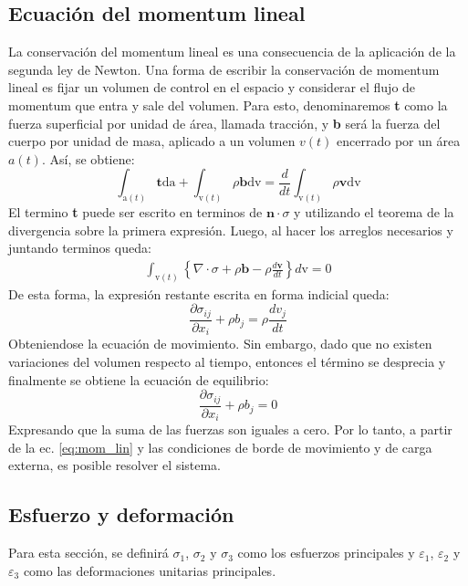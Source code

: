 \newpage

\subsection{Ecuación del momentum lineal}

La conservación del momentum lineal es una consecuencia de la aplicación de la segunda ley de Newton. Una forma de escribir la conservación de momentum lineal es fijar un volumen de control en el espacio y considerar el flujo de momentum que entra y sale del volumen. Para esto, denominaremos \textbf{t} como la fuerza superficial por unidad de área, llamada tracción, y \textbf{b} será la fuerza del cuerpo por unidad de masa, aplicado a un volumen $v(t)$ encerrado por un área $a(t)$. Así, se obtiene:
\begin{equation}
	\int_{\text{a}(t)} \mathbf{t} \text{da} + \int_{\text{v}(t)} \rho \mathbf{b} \text{dv} = \frac{d}{dt} \int_{\text{v}(t)} \rho \mathbf{v} \text{dv}
\end{equation}
El termino \textbf{t} puede ser escrito en terminos de $\mathbf{n}\cdot \sigma$ y utilizando el teorema de la divergencia sobre la primera expresión. Luego, al hacer los arreglos necesarios y juntando terminos queda:
\begin{gather*}
	\int_{\text{v}(t)} \left\lbrace \nabla \cdot \sigma + \rho\mathbf{b} - \rho \frac{d\mathbf{v}}{dt}\right\rbrace d\text{v} = 0
\end{gather*}
De esta forma, la expresión restante escrita en forma indicial queda:
\begin{equation}
	\frac{\partial \sigma_{ij}}{\partial x_i} + \rho b_j = \rho \frac{dv_j}{dt}
\end{equation}
Obteniendose la ecuación de movimiento. Sin embargo, dado que no existen variaciones del volumen respecto al tiempo, entonces el término se desprecia y finalmente se obtiene la ecuación de equilibrio:
\begin{equation}\label{eq:mom_lin}
	\frac{\partial \sigma_{ij}}{\partial x_i} + \rho b_j = 0
\end{equation}
Expresando que la suma de las fuerzas son iguales a cero. Por lo tanto, a partir de la ec. \ref{eq:mom_lin} y las condiciones de borde de movimiento y de carga externa, es posible resolver el sistema.

\subsection{Esfuerzo y deformación}
Para esta sección, se definirá $\sigma_1$, $\sigma_2$ y $\sigma_3$ como los esfuerzos principales y $\varepsilon_1$, $\varepsilon_2$ y $\varepsilon_3$ como las deformaciones unitarias principales. 
